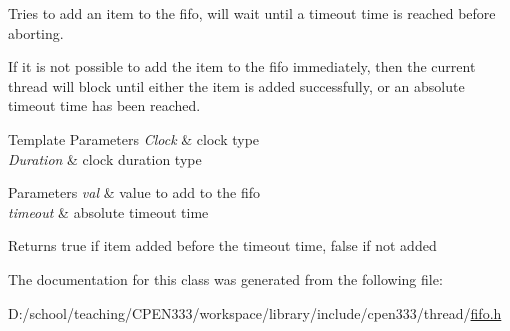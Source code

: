 Tries to add an item to the fifo, will wait until a timeout time is reached before aborting. 

If it is not possible to add the item to the fifo immediately, then the current thread will block until either the item is added successfully, or an absolute timeout time has been reached.


\begin{DoxyTemplParams}{Template Parameters}
{\em Clock} & clock type \\
\hline
{\em Duration} & clock duration type \\
\hline
\end{DoxyTemplParams}

\begin{DoxyParams}{Parameters}
{\em val} & value to add to the fifo \\
\hline
{\em timeout} & absolute timeout time \\
\hline
\end{DoxyParams}
\begin{DoxyReturn}{Returns}
{\ttfamily true} if item added before the timeout time, {\ttfamily false} if not added 
\end{DoxyReturn}


The documentation for this class was generated from the following file\+:\begin{DoxyCompactItemize}
\item 
D\+:/school/teaching/\+C\+P\+E\+N333/workspace/library/include/cpen333/thread/\hyperlink{thread_2fifo_8h}{fifo.\+h}\end{DoxyCompactItemize}
